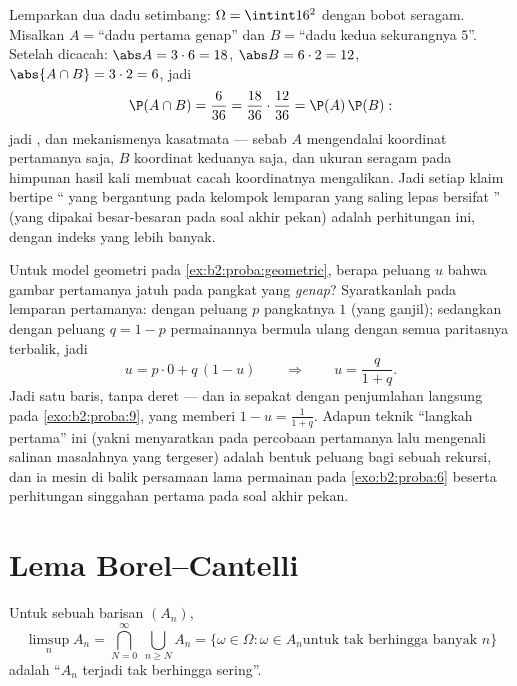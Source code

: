 \begin{example}\label{ex:b2:proba:productindep}
Lemparkan dua dadu setimbang: $\Omega = \intint16^2$ dengan bobot
seragam. Misalkan $A = {}$``dadu pertama genap'' dan $B = {}$``dadu
kedua sekurangnya $5$''. Setelah dicacah: $\abs A = 3\cdot6 = 18$,
$\abs B = 6\cdot2 = 12$, $\abs{A\cap B} = 3\cdot2 = 6$, jadi
\[
\P(A\cap B) = \frac6{36} = \frac{18}{36}\cdot\frac{12}{36} =
\P(A)\,\P(B) :
\]
jadi , dan mekanismenya kasatmata --- sebab $A$ mengendalai
koordinat pertamanya saja, $B$ koordinat keduanya saja, dan
ukuran seragam pada himpunan hasil kali membuat cacah koordinatnya
mengalikan. Jadi setiap klaim bertipe `` yang bergantung pada
kelompok lemparan yang saling lepas bersifat '' (yang dipakai besar-besaran
pada soal akhir pekan) adalah perhitungan ini, dengan indeks yang lebih banyak.
\end{example}

\begin{example}\label{ex:b2:proba:firststep}
Untuk model geometri pada \cref{ex:b2:proba:geometric},
berapa peluang $u$ bahwa gambar pertamanya jatuh pada pangkat yang
\emph{genap}? Syaratkanlah pada lemparan pertamanya: dengan peluang
$p$ pangkatnya $1$ (yang ganjil); sedangkan dengan peluang $q = 1 - p$
permainannya bermula ulang dengan semua paritasnya terbalik, jadi
\[
u = p\cdot0 + q\,(1 - u)
\qquad\Longrightarrow\qquad
u = \frac{q}{1 + q} .
\]
Jadi satu baris, tanpa deret --- dan ia sepakat dengan penjumlahan
langsung pada \cref{exo:b2:proba:9}, yang memberi $1 - u =
\frac1{1+q}$. Adapun teknik ``langkah pertama'' ini (yakni menyaratkan pada
percobaan pertamanya lalu mengenali salinan masalahnya yang tergeser) adalah
bentuk peluang bagi sebuah rekursi, dan ia
mesin di balik persamaan lama permainan pada
\cref{exo:b2:proba:6} beserta perhitungan singgahan pertama pada
soal akhir pekan.
\end{example}

\section{Lema Borel--Cantelli}

\begin{definition}\label{def:b2:proba:limsup}
Untuk sebuah barisan  $(A_n)$, 
\[
\limsup_n A_n
= \bigcap_{N=0}^{\infty}\ \bigcup_{n \geq N} A_n
= \{\omega \in \Omega : \omega \in A_n
\text{untuk tak berhingga banyak } n\}
\]
adalah  ``$A_n$ terjadi tak berhingga sering''.
\end{definition}

